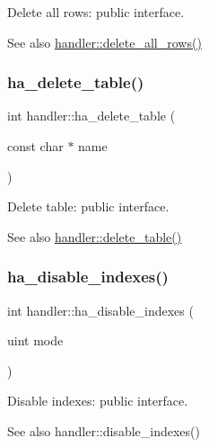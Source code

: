 Delete all rows\+: public interface.

\begin{DoxySeeAlso}{See also}
\mbox{\hyperlink{classhandler_ac24fcaab09a75e81702c2e2c34fa0b62}{handler\+::delete\+\_\+all\+\_\+rows()}} 
\end{DoxySeeAlso}
\mbox{\label{classhandler_a28700a3bf1af24f9a31ebae51bf877db}} 
\subsubsection{\texorpdfstring{ha\+\_\+delete\+\_\+table()}{ha\_delete\_table()}}
{\footnotesize\ttfamily int handler\+::ha\+\_\+delete\+\_\+table (\begin{DoxyParamCaption}\item[{const char $\ast$}]{name }\end{DoxyParamCaption})}

Delete table\+: public interface.

\begin{DoxySeeAlso}{See also}
\mbox{\hyperlink{classhandler_ae53ec34116b901cc08e5a87f5ec681a6}{handler\+::delete\+\_\+table()}} 
\end{DoxySeeAlso}
\mbox{\label{classhandler_aeeb079b3dc59160ba828ef89b4463921}} 
\subsubsection{\texorpdfstring{ha\+\_\+disable\+\_\+indexes()}{ha\_disable\_indexes()}}
{\footnotesize\ttfamily int handler\+::ha\+\_\+disable\+\_\+indexes (\begin{DoxyParamCaption}\item[{uint}]{mode }\end{DoxyParamCaption})}

Disable indexes\+: public interface.

\begin{DoxySeeAlso}{See also}
handler\+::disable\+\_\+indexes() 
\end{DoxySeeAlso}
\mbox{\label{classhandler_a1f75cf982985d21907140a17521cd6c5}} 
